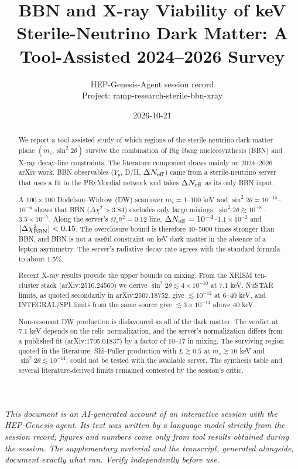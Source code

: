 \documentclass[11pt,a4paper]{article}
\title{BBN and X-ray Viability of keV Sterile-Neutrino Dark Matter: A Tool-Assisted 2024--2026 Survey}
\author{HEP-Genesis-Agent session record \\ \small Project: ramp-research-sterile-bbn-xray}
\date{2026-10-21}
\begin{document}
\maketitle
\noindent\textit{\small This document is an AI-generated account of an interactive session with the HEP-Genesis agent. Its text was written by a language model strictly from the session record; figures and numbers come only from tool results obtained during the session. The supplementary material and the transcript, generated alongside, document exactly what ran. Verify independently before use.}
\vspace{1em}

\begin{abstract}
We report a tool-assisted study of which regions of the sterile-neutrino dark-matter plane $(m_s,\sin^2 2\theta)$ survive the combination of Big Bang nucleosynthesis (BBN) and X-ray decay-line constraints. The literature component draws mainly on 2024--2026 arXiv work. BBN observables ($Y_p$, D/H, $\Delta N_{\rm eff}$) came from a sterile-neutrino server that uses a fit to the PRyMordial network and takes $\Delta N_{\rm eff}$ as its only BBN input.

A $100\times100$ Dodelson--Widrow (DW) scan over $m_s=1$--$100$ keV and $\sin^2 2\theta=10^{-15}$--$10^{-6}$ shows that BBN ($\Delta\chi^2>3.84$) excludes only large mixings, $\sin^2 2\theta\gtrsim 10^{-8}$--$3.5\times10^{-7}$. Along the server's $\Omega_s h^2=0.12$ line, $\Delta N_{\rm eff}=10^{-4}$--$1.1\times10^{-2}$ and $|\Delta\chi^2_{\rm BBN}|<0.15$. The overclosure bound is therefore 40--5000 times stronger than BBN, and BBN is not a useful constraint on keV dark matter in the absence of a lepton asymmetry. The server's radiative decay rate agrees with the standard formula to about 1.5\%.

Recent X-ray results provide the upper bounds on mixing. From the XRISM ten-cluster stack (arXiv:2510.24560) we derive $\sin^2 2\theta\lesssim4\times10^{-10}$ at 7.1 keV. NuSTAR limits, as quoted secondarily in arXiv:2507.18752, give $\lesssim10^{-12}$ at 6--40 keV, and INTEGRAL/SPI limits from the same source give $\lesssim3\times10^{-14}$ above 40 keV.

Non-resonant DW production is disfavoured as all of the dark matter. The verdict at 7.1 keV depends on the relic normalization, and the server's normalization differs from a published fit (arXiv:1705.01837) by a factor of 10--17 in mixing. The surviving region quoted in the literature, Shi--Fuller production with $L\gtrsim0.5$ at $m_s\gtrsim10$ keV and $\sin^2 2\theta\lesssim10^{-14}$, could not be tested with the available server. The synthesis table and several literature-derived limits remained contested by the session's critic.
\end{abstract}
\end{document}
